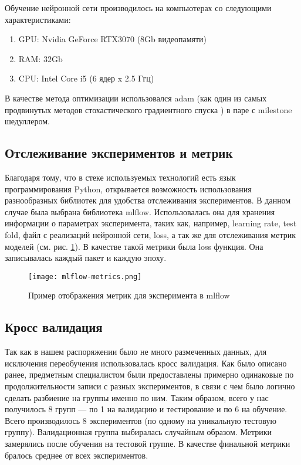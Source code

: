 Обучение нейронной сети производилось на компьютерах со следующими характеристиками:

\begin{enumerate}
	\item GPU: Nvidia GeForce RTX3070 (8Gb видеопамяти)
	\item RAM: 32Gb
	\item CPU: Intel Core i5 (6 ядер x 2.5 Ггц)
\end{enumerate}

В качестве метода оптимизации использовался adam (как один из самых продвинутых
методов стохастического градиентного спуска \cite{adam}) в паре с milestone шедуллером.

\subsection{Отслеживание экспериментов и метрик}

Благодаря тому, что в стеке используемых технологий есть язык программирования
Python, открывается возможность использования разнообразных библиотек для
удобства отслеживания экспериментов. В данном случае была выбрана библиотека
mlflow. Использовалась она для хранения информации о параметрах эксперимента,
таких как, например, learning rate, test fold, файл с реализаций нейронной
сети, loss, а так же для отслеживания метрик моделей (см. рис.
\ref{fig:mlflow-metrics}). В качестве такой метрики была loss функция. Она
записывалась каждый пакет и каждую эпоху.

\begin{figure}[!htb]
	\centering
	\caption{Пример отображения метрик для эксперимента в mlflow}
	\texttt{[image: mlflow-metrics.png]}
	\label{fig:mlflow-metrics}
\end{figure}


\subsection{Кросс валидация}
Так как в нашем распоряжении было не много размеченных данных, для исключения
переобучения использовалась кросс валидация. Как было описано ранее, предметным
специалистом были предоставлены примерно одинаковые по продолжительности записи
с разных экспериментов, в связи с чем было логично сделать разбиение на группы
именно по ним. Таким образом, всего у нас получилось 8 групп --- по 1 на
валидацию и тестирование и по 6 на обучение. Всего производилось 8
экспериментов (по одному на уникальную тестовую группу). Валидационная группа
выбиралась случайным образом. Метрики замерялись после обучения на тестовой
группе. В качестве финальной метрики бралось среднее от всех экспериментов.


